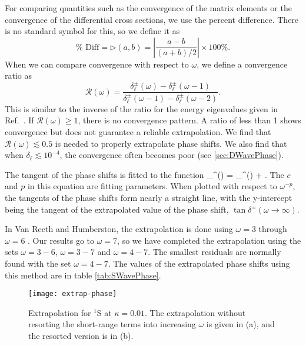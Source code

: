 \documentclass[Dissertation.tex]{subfiles}
\begin{document}
For comparing quantities such as the convergence of the matrix elements or 
the convergence of the differential cross sections, we use the percent
difference. There is no standard symbol for this, so we define it as
\begin{equation}
\label{eq:PercentDiff}
\% \text{ Diff} = \rhd(a,b) = \left| \frac{a - b}{(a + b) / 2} \right| \times 100\%.
\end{equation}
When we can compare convergence with respect to $\omega$, we define a
convergence ratio as
\begin{equation}
\label{eq:ConvRatio}
\mathcal{R}(\omega) = \frac{\delta_\ell^\pm(\omega)-\delta_\ell^\pm(\omega-1)}
  {\delta_\ell^\pm(\omega-1)-\delta_\ell^\pm(\omega-2)}.
\end{equation}
This is similar to the inverse of the ratio for the energy eigenvalues given in
Ref.~\cite{Yan1999}. If $\mathcal{R}(\omega) \geq 1$, there is no convergence
pattern. A ratio of less than 1 shows convergence but does not guarantee a
reliable extrapolation. We find that $\mathcal{R}(\omega) \lesssim 0.5$ is
needed to properly extrapolate phase shifts. We also find that when
$\delta_\ell \lesssim 10^{-4}$, the convergence often becomes poor
(see \cref{sec:DWavePhase}).

The tangent of the phase shifts is fitted to the function
\beq
\label{eq:PhaseExtrap}
\tan \delta_\ell^\pm(\omega) = \tan \delta_\ell^\pm(\omega \to \infty) + .
\eeq
The $c$ and $p$ in this equation are fitting parameters. When plotted with respect to $\omega^{-p}$, the tangents of the phase shifts form nearly a straight line, with the y-intercept being the tangent of the extrapolated value of the phase shift, $\tan \delta^\pm(\omega \to \infty)$.

In Van Reeth and Humberston, the extrapolation is done using $\omega = 3$ through $\omega = 6$ \cite{VanReeth2003}. Our results go to $\omega = 7$, so we have completed the extrapolation using the sets $\omega = 3-6$, $\omega = 3-7$ and $\omega = 4-7$. The smallest residuals are normally found with the set $\omega = 4-7$. The values of the extrapolated phase shifts using this method are in table \ref{tab:SWavePhase}.

\begin{figure}[H]
	\centering
	\texttt{[image: extrap-phase]}
	\caption[Extrapolation for $^1$S at $\kappa = 0.01$]{Extrapolation for $^1$S at $\kappa = 0.01$. The extrapolation without resorting the short-range terms into increasing $\omega$ is given in (a), and the resorted version is in (b).}
	\label{fig:extrap-phase}
\end{figure}
\end{document}
